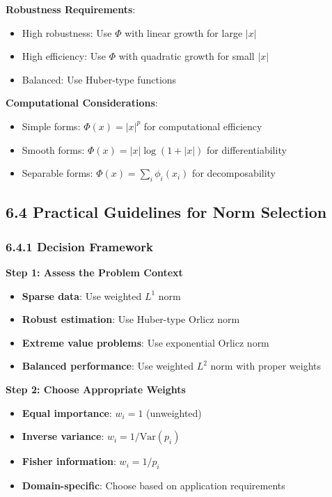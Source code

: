 \documentclass{amsart}
\theoremstyle{plain}
\theoremstyle{definition}
\theoremstyle{remark}
\begin{document}
\textbf{Robustness Requirements}:

\begin{itemize}
	\item High robustness: Use $\Phi$ with linear growth for large $|x|$
	\item High efficiency: Use $\Phi$ with quadratic growth for small $|x|$
	\item Balanced: Use Huber-type functions
\end{itemize}

\textbf{Computational Considerations}:

\begin{itemize}
	\item Simple forms: $\Phi(x) = |x|^p$ for computational efficiency
	\item Smooth forms: $\Phi(x) = |x|\log(1 + |x|)$ for differentiability
	\item Separable forms: $\Phi(x) = \sum_i \phi_i(x_i)$ for decomposability
\end{itemize}

\subsection{6.4 Practical Guidelines for Norm Selection}

\subsubsection{6.4.1 Decision Framework}

\textbf{Step 1: Assess the Problem Context}

\begin{itemize}
	\item \textbf{Sparse data}: Use weighted $L^1$ norm
	\item \textbf{Robust estimation}: Use Huber-type Orlicz norm
	\item \textbf{Extreme value problems}: Use exponential Orlicz norm
	\item \textbf{Balanced performance}: Use weighted $L^2$ norm with proper weights
\end{itemize}

\textbf{Step 2: Choose Appropriate Weights}

\begin{itemize}
	\item \textbf{Equal importance}: $w_i = 1$ (unweighted)
	\item \textbf{Inverse variance}: $w_i = 1/\text{Var}(p_i)$
	\item \textbf{Fisher information}: $w_i = 1/p_i$
	\item \textbf{Domain-specific}: Choose based on application requirements
\end{itemize}
\end{document}
